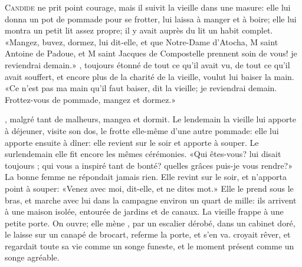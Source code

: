 \lettrine{C}{andide} ne prit point courage, mais il suivit la vieille dans une
masure: elle lui donna un pot de pommade pour se frotter, lui laissa à
manger et à boire; elle lui montra un petit lit assez propre; il y
avait auprès du lit un habit complet. «Mangez, buvez, dormez, lui
dit-elle, et que Notre-Dame d’Atocha, M saint Antoine de
Padoue, et M saint Jacques de Compostelle prennent soin de
vous! je reviendrai demain.» , toujours étonné de tout ce qu’il
avait vu, de tout ce qu’il avait souffert, et encore plus de la charité
de la vieille, voulut lui baiser la main. «Ce n’est pas ma main qu’il
faut baiser, dit la vieille; je reviendrai demain. Frottez-vous de
pommade, mangez et dormez.»



, malgré tant de malheurs, mangea et dormit. Le lendemain la
vieille lui apporte à déjeuner, visite son dos, le frotte elle-même
d’une autre pommade: elle lui apporte ensuite à dîner: elle revient sur
le soir et apporte à souper. Le surlendemain elle fit encore les mêmes
cérémonies. «Qui êtes-vous? lui disait toujours ; qui vous a
inspiré tant de bonté? quelles grâces puis-je vous rendre?» La bonne
femme ne répondait jamais rien. Elle revint sur le soir, et n’apporta
point à souper: «Venez avec moi, dit-elle, et ne dites mot.» Elle le
prend sous le bras, et marche avec lui dans la campagne environ un
quart de mille: ils arrivent à une maison isolée, entourée de jardins
et de canaux. La vieille frappe à une petite porte. On ouvre; elle mène
, par un escalier dérobé, dans un cabinet doré, le laisse sur un
canapé de brocart, referme la porte, et s’en va.  croyait rêver,
et regardait toute sa vie comme un songe funeste, et le moment présent
comme un songe agréable.

